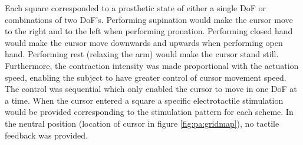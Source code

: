 Each square corresponded to a prosthetic state of either a single DoF or combinations of two DoF's. Performing supination would make the cursor move to the right and to the left when performing pronation. Performing closed hand would make the cursor move downwards and upwards when performing open hand. Performing rest (relaxing the arm) would make the cursor stand still. Furthermore, the contraction intensity was made proportional with the actuation speed, enabling the subject to have greater control of cursor movement speed. The control was sequential which only enabled the cursor to move in one DoF at a time. When the cursor entered a square a specific electrotactile stimulation would be provided corresponding to the stimulation pattern for each scheme. In the neutral position (location of cursor in figure \ref{fig:pa:gridmap}), no tactile feedback was provided.     

